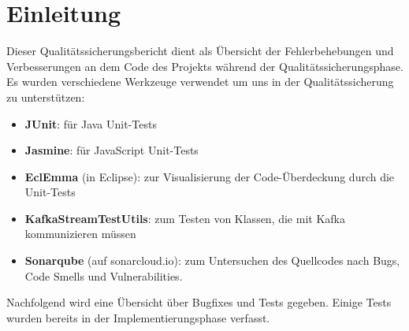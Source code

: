 \chapter{Einleitung}
Dieser Qualitätssicherungsbericht dient als Übersicht der Fehlerbehebungen und Verbesserungen an dem Code des Projekts während der Qualitätssicherungsphase.
\vspace{1em}\newline
Es wurden verschiedene Werkzeuge verwendet um uns in der Qualitätssicherung zu unterstützen:
\begin{itemize}
	\item \textbf{JUnit}: für Java Unit-Tests
	\item \textbf{Jasmine}: für JavaScript Unit-Tests
	\item \textbf{EclEmma} (in Eclipse): zur Visualisierung der Code-Überdeckung durch die Unit-Tests
	\item \textbf{KafkaStreamTestUtils}: zum Testen von Klassen, die mit Kafka kommunizieren müssen
	\item \textbf{Sonarqube} (auf sonarcloud.io): zum Untersuchen des Quellcodes nach Bugs, Code Smells und Vulnerabilities.
\end{itemize}
\vspace{1em}
Nachfolgend wird eine Übersicht über Bugfixes und Tests gegeben. Einige Tests wurden bereits in der Implementierungsphase verfasst.